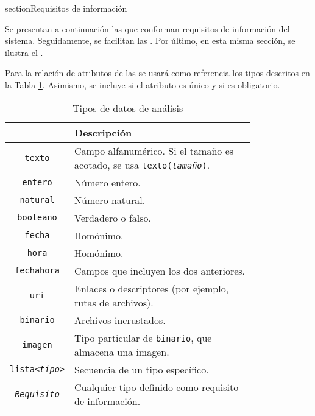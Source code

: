 section{\forlnameref Requisitos de información}
\label{sec:informationReqs}

Se presentan a continuación las  que conforman requisitos de información del sistema. Seguidamente, se facilitan las . Por último, en esta misma sección, se ilustra el .

Para la relación de atributos de las  se usará como referencia los tipos descritos en la Tabla \ref{tab:analysisDataTypes}. Asimismo, se incluye si el atributo es único y si es obligatorio.

\captionsetup[table]{singlelinecheck=true}
\begin{table}[ht]
\centering
\begin{tabular}{|c|p{0.8\linewidth}|} 
\hline
\header{Tipo de dato    & Descripción} \\ \hline
\texttt{texto} & Campo alfanumérico. Si el tamaño es acotado, se usa \texttt{texto(\textit{tamaño})}. \\ \hline
\texttt{entero} & Número entero. \\ \hline
\texttt{natural} & Número natural. \\ \hline
\texttt{booleano} & Verdadero o falso. \\ \hline
\texttt{fecha} & Homónimo. \\ \hline
\texttt{hora} & Homónimo. \\ \hline
\texttt{fechahora} & Campos que incluyen los dos anteriores. \\ \hline
\texttt{uri}    & Enlaces o descriptores (por ejemplo, rutas de archivos). \\ \hline
\texttt{binario} & Archivos incrustados. \\ \hline
\texttt{imagen} & Tipo particular de \texttt{binario}, que almacena una imagen. \\ \hline
\texttt{lista<\textit{tipo}>} & Secuencia de un tipo específico. \\ \hline
\texttt{\textit{Requisito}} & Cualquier tipo definido como requisito de información. \\ \hline
\end{tabular}
\caption{Tipos de datos de análisis}
\label{tab:analysisDataTypes}
\end{table}


